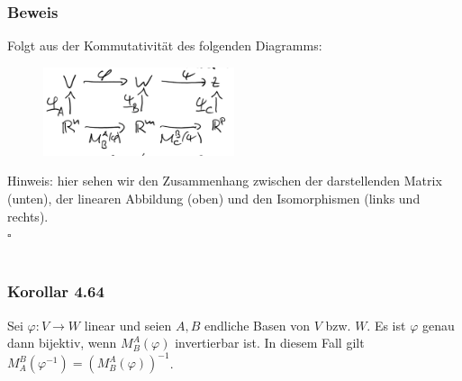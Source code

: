 \documentclass{article}
\begin{document}
\subsubsection*{Beweis}
Folgt aus der Kommutativität des folgenden Diagramms: \\
\begin{center}
    \begin{figure}[h]
        \centering
        \includegraphics[width=0.5\textwidth]{Images/4.63.png}
    \end{figure}
\end{center}
Hinweis: hier sehen wir den Zusammenhang zwischen der darstellenden Matrix (unten), der linearen Abbildung (oben) und den Isomorphismen (links und rechts). \\
$\square$ \\
\\
\subsubsection*{Korollar 4.64}
Sei $\varphi: V \rightarrow W$ linear und seien $A, B$ endliche Basen von $V$ bzw. $W$. Es ist $\varphi$ genau dann bijektiv, wenn $M_B^{A}(\varphi)$ invertierbar ist. 
In diesem Fall gilt $M_A^{B}(\varphi^{-1}) = (M_B^{A}(\varphi))^{-1}$. \\
\\
\end{document}
